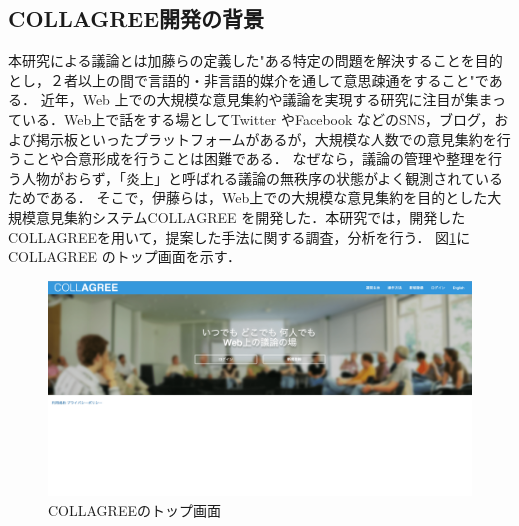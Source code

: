 \subsection{COLLAGREE開発の背景}
\label{rel:collagree:bg}
本研究による議論とは加藤ら\cite{argDefine}の定義した"ある特定の問題を解決することを目的とし，２者以上の間で言語的・非言語的媒介を通して意思疎通をすること"である．
近年，Web 上での大規模な意見集約や議論を実現する研究に注目が集まっている．Web上で話をする場としてTwitter やFacebook などのSNS，ブログ，および掲示板といったプラットフォームがあるが，大規模な人数での意見集約を行うことや合意形成を行うことは困難である．
なぜなら，議論の管理や整理を行う人物がおらず，「炎上」と呼ばれる議論の無秩序の状態がよく観測されているためである．
そこで，伊藤ら\cite{collagreeSystem}は，Web上での大規模な意見集約を目的とした大規模意見集約システムCOLLAGREE を開発した．本研究では，開発したCOLLAGREEを用いて，提案した手法に関する調査，分析を行う．
図\ref{Fig:collagreeTop}にCOLLAGREE のトップ画面を示す．
\begin{figure}[htbp]
 \begin{center}
  \includegraphics[width=\textwidth]{../images/2.Related_Work/COLLAGREE_Main-min.png}
  \caption{COLLAGREEのトップ画面}
  \label{Fig:collagreeTop}
  \vspace{-10pt}
 \end{center}
\end{figure}

